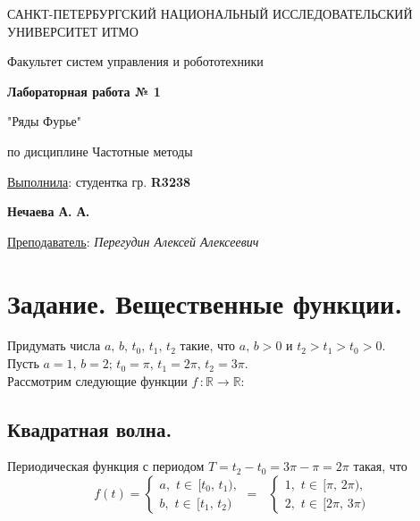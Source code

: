 \documentclass[a5paper, 10pt]{article}
\theoremstyle{definition}
\theoremstyle{plain}
\theoremstyle{remark}
\newcommand*{\titlePage}{
	\thispagestyle{title}
	\begingroup
	\begin{center}
		\vspace*{6ex}
		
		{\small
			САНКТ-ПЕТЕРБУРГСКИЙ НАЦИОНАЛЬНЫЙ ИССЛЕДОВАТЕЛЬСКИЙ УНИВЕРСИТЕТ ИТМО	
		}
		
		\vspace*{2ex}
		
		{\normalsize
			Факультет систем управления и робототехники
		}
		
		\vspace*{15ex}
		
		{\Large \bfseries 
			Лабораторная работа № 1
		}
\vspace*{2ex}
	{\Large \bfseries 
			
"Ряды Фурье"
		}
\vspace*{2ex}
		
		{\normalsize
			по дисциплине Частотные методы
		}

	\end{center}
	\vspace*{20ex}
	\begin{flushright}
		{\large 
			\underline{Выполнила}: студентка гр. \textbf{R3238}\\
			\begin{flushright}
				\textbf{Нечаева А. А.}\\
			\end{flushright}
		}
		
		\vspace*{5ex}
		
		{\large 
			\underline{Преподаватель}: \textit{Перегудин Алексей Алексеевич}
		}
	\end{flushright}	
	\newpage
	\setcounter{page}{1}
	\endgroup}
\begin{document}
	\titlePage
	\pagestyle{style}




\newpage
\section{Задание. Вещественные функции.}
Придумать числа $a, \, b, \, t_0, \, t_1, \, t_2$ такие, что $a, \, b > 0$ и $t_2 > t_1 > t_0 > 0$. \\
Пусть $a = 1, \, b = 2; \, t_0 = \pi, \, t_1 = 2 \pi, \, t_2 = 3 \pi$. \\ Рассмотрим следующие функции $f\, : \mathbb{R} \to \mathbb{R}$:

\subsection{Квадратная волна.}
Периодическая функция с периодом $T=t_2 - t_0 = 3 \pi - \pi = 2 \pi$ такая, что 
\begin{equation}
f(t) =
\begin{cases}
a, \, \, t \in \, [t_0, \, t_1 ),\\
b, \, \, t \in \, [t_1, \, t_2 )
\end{cases}
= \,\,\,\,
\begin{cases}
1, \, \, t \in \, [\pi, \, 2 \pi ),\\
2, \, \, t \in \, [2 \pi, \, 3 \pi)
\end{cases}
\end{equation}
\end{document}
